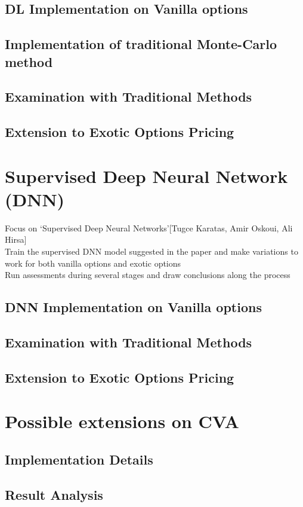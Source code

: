 \documentclass{report}
\begin{document}
\subsection{DL Implementation on Vanilla options}
\subsection{Implementation of  traditional Monte-Carlo method}
\subsection{Examination with Traditional Methods}
\subsection{Extension to Exotic Options Pricing}

\section{Supervised Deep Neural Network (DNN)}
Focus on ‘Supervised Deep Neural Networks’[Tugce Karatas, Amir Oskoui, Ali Hirsa]\\
Train the supervised DNN model suggested in the paper and make variations to work for both vanilla options and exotic options\\
Run assessments during several stages and draw conclusions along the process

\subsection{DNN Implementation on Vanilla options}
\subsection{Examination with Traditional Methods}
\subsection{Extension to Exotic Options Pricing}

\section{Possible extensions on CVA}
\subsection{Implementation Details}
\subsection{Result Analysis}
\end{document}
